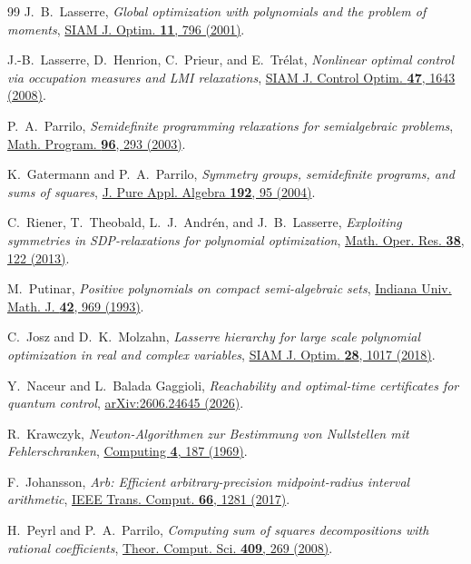 \documentclass[aps,prx,reprint,nofootinbib,longbibliography,floatfix]{revtex4-2}
\theoremstyle{plain}
\theoremstyle{remark}
\begin{document}
\begin{thebibliography}{99}
J.~B.~Lasserre,
\emph{Global optimization with polynomials and the problem of moments},
\href{https://doi.org/10.1137/S1052623400366802}{SIAM J. Optim. \textbf{11}, 796 (2001)}.

J.-B.~Lasserre, D.~Henrion, C.~Prieur, and E.~Tr{\'e}lat,
\emph{Nonlinear optimal control via occupation measures and LMI relaxations},
\href{https://doi.org/10.1137/070685051}{SIAM J. Control Optim. \textbf{47}, 1643 (2008)}.

P.~A.~Parrilo,
\emph{Semidefinite programming relaxations for semialgebraic problems},
\href{https://doi.org/10.1007/s10107-003-0387-5}{Math. Program. \textbf{96}, 293 (2003)}.

K.~Gatermann and P.~A.~Parrilo,
\emph{Symmetry groups, semidefinite programs, and sums of squares},
\href{https://doi.org/10.1016/j.jpaa.2003.12.011}{J. Pure Appl. Algebra \textbf{192}, 95 (2004)}.

C.~Riener, T.~Theobald, L.~J.~Andr{\'e}n, and J.~B.~Lasserre,
\emph{Exploiting symmetries in SDP-relaxations for polynomial optimization},
\href{https://doi.org/10.1287/moor.1120.0558}{Math. Oper. Res. \textbf{38}, 122 (2013)}.

M.~Putinar,
\emph{Positive polynomials on compact semi-algebraic sets},
\href{https://doi.org/10.1512/iumj.1993.42.42045}{Indiana Univ. Math. J. \textbf{42}, 969 (1993)}.

C.~Josz and D.~K.~Molzahn,
\emph{Lasserre hierarchy for large scale polynomial optimization in real and complex variables},
\href{https://doi.org/10.1137/15M1034386}{SIAM J. Optim. \textbf{28}, 1017 (2018)}.

Y.~Naceur and L.~Balada Gaggioli,
\emph{Reachability and optimal-time certificates for quantum control},
\href{https://arxiv.org/abs/2606.24645}{arXiv:2606.24645 (2026)}.

R.~Krawczyk,
\emph{Newton-Algorithmen zur Bestimmung von Nullstellen mit Fehlerschranken},
\href{https://doi.org/10.1007/BF02234767}{Computing \textbf{4}, 187 (1969)}.

F.~Johansson,
\emph{Arb: Efficient arbitrary-precision midpoint-radius interval arithmetic},
\href{https://doi.org/10.1109/TC.2017.2690633}{IEEE Trans. Comput. \textbf{66}, 1281 (2017)}.

H.~Peyrl and P.~A.~Parrilo,
\emph{Computing sum of squares decompositions with rational coefficients},
\href{https://doi.org/10.1016/j.tcs.2008.09.025}{Theor. Comput. Sci. \textbf{409}, 269 (2008)}.


\end{thebibliography}
\end{document}
